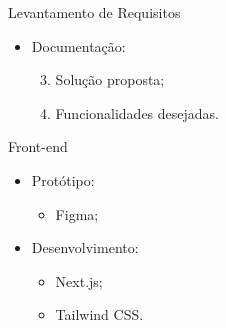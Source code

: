 \begin{frame}{Levantamento de Requisitos}
    \begin{itemize}
        \item Documentação: \vspace{0.5cm}
              \begin{enumerate}
                  \setcounter{enumi}{2}
                  \item Solução proposta; \vspace{0.5cm}
                  \item Funcionalidades desejadas. \vspace{0.5cm}
              \end{enumerate}
    \end{itemize}
\end{frame}

\begin{frame}{Front-end}
    \begin{itemize}
        \item Protótipo: \vspace{0.5cm}
              \begin{itemize}
                  \item Figma; \vspace{0.5cm}
              \end{itemize}
        \item Desenvolvimento: \vspace{0.5cm}
              \begin{itemize}
                  \item Next.js; \vspace{0.5cm}
                  \item Tailwind CSS. \vspace{0.5cm}
              \end{itemize}
    \end{itemize}
\end{frame}

